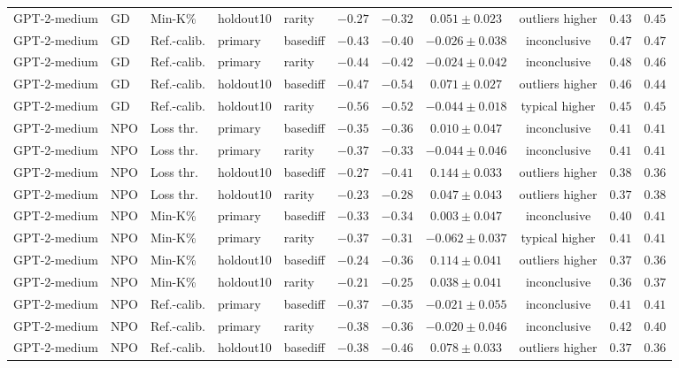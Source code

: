 \begin{table}[t]
\begin{tabular*}{\textwidth}{@{\extracolsep{\fill}}lllllcccccc@{}}
GPT-2-medium & GD & Min-K\% & holdout10 & rarity & $-0.27$ & $-0.32$ & $0.051 \pm 0.023$ & outliers higher & $0.43$ & $0.45$ \\
GPT-2-medium & GD & Ref.-calib. & primary & basediff & $-0.43$ & $-0.40$ & $-0.026 \pm 0.038$ & inconclusive & $0.47$ & $0.47$ \\
GPT-2-medium & GD & Ref.-calib. & primary & rarity & $-0.44$ & $-0.42$ & $-0.024 \pm 0.042$ & inconclusive & $0.48$ & $0.46$ \\
GPT-2-medium & GD & Ref.-calib. & holdout10 & basediff & $-0.47$ & $-0.54$ & $0.071 \pm 0.027$ & outliers higher & $0.46$ & $0.44$ \\
GPT-2-medium & GD & Ref.-calib. & holdout10 & rarity & $-0.56$ & $-0.52$ & $-0.044 \pm 0.018$ & typical higher & $0.45$ & $0.45$ \\
GPT-2-medium & NPO & Loss thr. & primary & basediff & $-0.35$ & $-0.36$ & $0.010 \pm 0.047$ & inconclusive & $0.41$ & $0.41$ \\
GPT-2-medium & NPO & Loss thr. & primary & rarity & $-0.37$ & $-0.33$ & $-0.044 \pm 0.046$ & inconclusive & $0.41$ & $0.41$ \\
GPT-2-medium & NPO & Loss thr. & holdout10 & basediff & $-0.27$ & $-0.41$ & $0.144 \pm 0.033$ & outliers higher & $0.38$ & $0.36$ \\
GPT-2-medium & NPO & Loss thr. & holdout10 & rarity & $-0.23$ & $-0.28$ & $0.047 \pm 0.043$ & outliers higher & $0.37$ & $0.38$ \\
GPT-2-medium & NPO & Min-K\% & primary & basediff & $-0.33$ & $-0.34$ & $0.003 \pm 0.047$ & inconclusive & $0.40$ & $0.41$ \\
GPT-2-medium & NPO & Min-K\% & primary & rarity & $-0.37$ & $-0.31$ & $-0.062 \pm 0.037$ & typical higher & $0.41$ & $0.41$ \\
GPT-2-medium & NPO & Min-K\% & holdout10 & basediff & $-0.24$ & $-0.36$ & $0.114 \pm 0.041$ & outliers higher & $0.37$ & $0.36$ \\
GPT-2-medium & NPO & Min-K\% & holdout10 & rarity & $-0.21$ & $-0.25$ & $0.038 \pm 0.041$ & inconclusive & $0.36$ & $0.37$ \\
GPT-2-medium & NPO & Ref.-calib. & primary & basediff & $-0.37$ & $-0.35$ & $-0.021 \pm 0.055$ & inconclusive & $0.41$ & $0.41$ \\
GPT-2-medium & NPO & Ref.-calib. & primary & rarity & $-0.38$ & $-0.36$ & $-0.020 \pm 0.046$ & inconclusive & $0.42$ & $0.40$ \\
GPT-2-medium & NPO & Ref.-calib. & holdout10 & basediff & $-0.38$ & $-0.46$ & $0.078 \pm 0.033$ & outliers higher & $0.37$ & $0.36$ \\

\end{tabular*}
\end{table}
